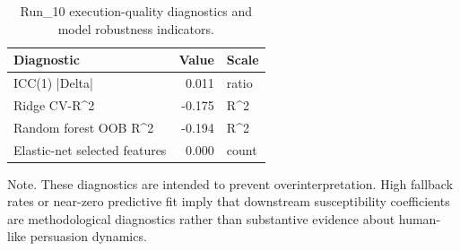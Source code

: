 \begin{table}[htbp]
\centering
\begin{threeparttable}
\caption{Run\_10 execution-quality diagnostics and model robustness indicators.}
\label{tab:qualitydiag}
\small
\setlength{\tabcolsep}{4.5pt}
\renewcommand{\arraystretch}{1.10}
\begin{tabular}{lrl}
\toprule
Diagnostic & Value & Scale \\
\midrule
ICC(1) |Delta| & 0.011 & ratio \\
Ridge CV-R\textasciicircum 2 & -0.175 & R\textasciicircum 2 \\
Random forest OOB R\textasciicircum 2 & -0.194 & R\textasciicircum 2 \\
Elastic-net selected features & 0.000 & count \\
\bottomrule
\end{tabular}
\begin{tablenotes}[flushleft]
\footnotesize
\item Note. These diagnostics are intended to prevent overinterpretation. High fallback rates or near-zero predictive fit imply that downstream susceptibility coefficients are methodological diagnostics rather than substantive evidence about human-like persuasion dynamics.
\end{tablenotes}
\end{threeparttable}
\end{table}